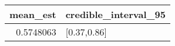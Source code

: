 \begin{longtable}{rl}
\toprule
mean\_est & credible\_interval\_95 \\ 
\midrule
0.5748063 & [0.37,0.86] \\ 
\bottomrule
\end{longtable}

